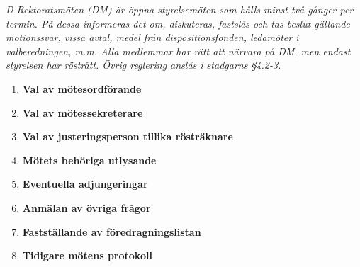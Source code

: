 \documentclass{protokoll}
\begin{document}
{\small \textit{D-Rektoratsmöten (DM) är öppna styrelsemöten som hålls minst två gånger per termin. På dessa informeras det om, diskuteras, fastslås och tas beslut gällande motionssvar, vissa avtal, medel från dispositionsfonden, ledamöter i valberedningen, m.m. Alla medlemmar har rätt att närvara på DM, men endast styrelsen har rösträtt. Övrig reglering anslås i stadgarns §4.2-3.}}\\

\begin{motesfakta} %
  \narvarande
\end{motesfakta}




  \begin{enumerate}
    \item\textbf{Val av mötesordförande}\\
    \item\textbf{Val av mötessekreterare}\\
    \item\textbf{Val av justeringsperson tillika rösträknare}\\
    \item\textbf{Mötets behöriga utlysande}\\
    \item\textbf{Eventuella adjungeringar}\\
    \item\textbf{Anmälan av övriga frågor}\\
    \item\textbf{Fastställande av föredragningslistan}\\
    \item\textbf{Tidigare mötens protokoll}\\
  \end{enumerate}
\end{document}
